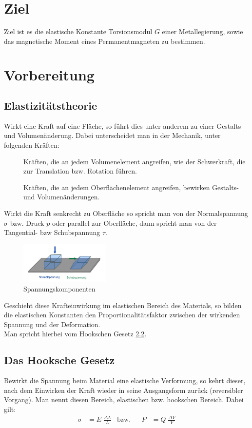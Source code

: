 \section{Ziel}
Ziel ist es die elastische Konstante Torsionsmodul $G$ einer Metallegierung, sowie das magnetische Moment eines Permanentmagneten zu bestimmen.


\section{Vorbereitung}
\subsection{Elastizitätstheorie}
Wirkt eine Kraft auf eine Fläche, so führt dies unter anderem zu einer Gestalts- und Volumenänderung.
Dabei unterscheidet man in der Mechanik, unter folgenden Kräften:
\begin{description}
    \item[]
    Kräften, die an jedem Volumenelement angreifen, wie der Schwerkraft, die zur Translation bzw. Rotation führen.
    \item[]
    Kräften, die an jedem Oberflächenelement angreifen, bewirken Gestalts- und Volumenänderungen.
\end{description}

Wirkt die Kraft senkrecht zu Oberfläche so spricht man von der Normalspannung $\sigma$ bzw. Druck $p$ oder parallel zur Oberfläche,
dann spricht man von der Tangential- bzw Schubspannung $\tau$.
\begin{figure}[h]
  \centering
  \includegraphics[width=0.4\textwidth, height=0.2\textwidth]{bilder/Spannungkomponenten.jpg}
  \caption{Spannungskomponenten}
  \label{fig:Spannungkomponenten}
\end{figure}

Geschieht diese Krafteinwirkung im elastischen Bereich des Materials,
so bilden die elastischen Konstanten den Proportionalitätsfaktor zwischen der
wirkenden Spannung und der Deformation.\\
Man spricht hierbei vom Hookschen Gesetz \ref{sec:Hooksche_Gesetz}.

\subsection{Das Hooksche Gesetz}
\label{sec:Hooksche_Gesetz}
Bewirkt die Spannung beim Material eine elastische Verformung, so kehrt dieser, nach dem Einwirken 
der Kraft wieder in seine Ausgangsform zurück (reversibler Vorgang). Man nennt diesen Bereich, elastischen bzw. hookschen Bereich.
Dabei gilt:
\begin{align}
    \sigma &= E \; \frac{\Delta L}{L} & \mathrm{bzw.} & & P &=Q \;\frac{\Delta V}{V}
\end{align}
\label{eqn:def_hooksche}
\newpage


